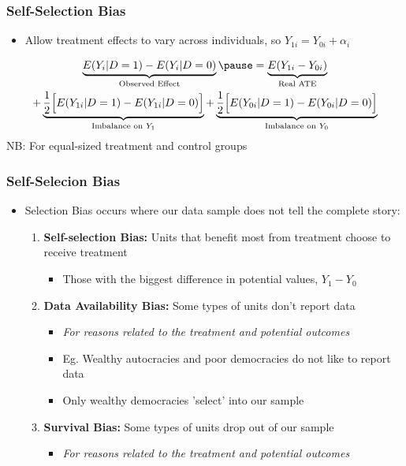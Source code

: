\documentclass[xcolor=x11names,compress]{beamer}\usepackage[]{graphicx}\usepackage[]{color}
\renewcommand{\(}{\begin{columns}}
\renewcommand{\)}{\end{columns}}
\newcommand{\<}[1]{\begin{column}{#1}}
\renewcommand{\>}{\end{column}}
\begin{document}
\begin{frame}
\frametitle{Self-Selection Bias}
\begin{itemize}
\item Allow treatment effects to vary across individuals, so $Y_{1i} = Y_{0i} + \alpha_i$
\end{itemize}
\pause
\begin{multline}
\underbrace{E(Y_i|D=1)-E(Y_i|D=0)}_\text{Observed Effect} \pause = \underbrace{E(Y_{1i} - Y_{0i})}_\text{Real ATE} \\ + \underbrace{\frac{1}{2}\Big[ E(Y_{1i}|D=1) - E(Y_{1i}|D=0) \Big]}_\text{Imbalance on $Y_1$} + \underbrace{\frac{1}{2}\Big[ E(Y_{0i}|D=1) - E(Y_{0i}|D=0) \Big]}_\text{Imbalance on $Y_0$}
\end{multline}
\footnotesize
NB: For equal-sized treatment and control groups
\normalsize
\end{frame}

\begin{frame}
\frametitle{Self-Selecion Bias}
\begin{itemize}
\item Selection Bias occurs where our data sample does not tell the complete story:
\pause
\begin{enumerate}
\item \textbf{Self-selection Bias:} Units that benefit most from treatment choose to receive treatment
\begin{itemize}
\item Those with the biggest difference  in potential values, $Y_1 - Y_0$
\end{itemize}
\item \textbf{Data Availability Bias:} Some types of units don't report data
\begin{itemize}
\item \textit{For reasons related to the treatment and potential outcomes}
\pause
\item Eg. Wealthy autocracies and poor democracies do not like to report data
\pause
\item Only wealthy democracies 'select' into our sample
\end{itemize}
\item \textbf{Survival Bias:} Some types of units drop out of our sample
\begin{itemize}
\item \textit{For reasons related to the treatment and potential outcomes}
\end{itemize}
\end{enumerate}
\end{itemize}
\end{frame}
\end{document}
